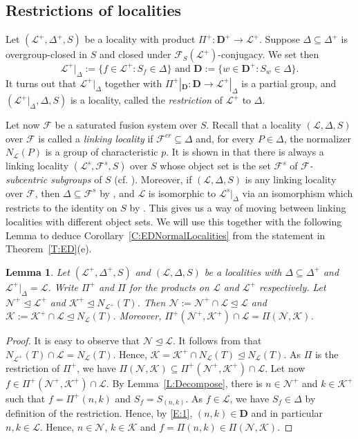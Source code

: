 \documentclass[reqno,11pt]{amsart}
\numberwithin{equation}{section}
\newtheorem{lemma}[theorem]{Lemma}
\theoremstyle{definition}
\newcommand{\F}{\mathcal{F}}
\renewcommand{\L}{\mathcal{L}}
\newcommand{\N}{\mathcal{N}}
\newcommand{\K}{\mathcal{K}}
\newcommand{\D}{\mathbf{D}}
\begin{document}
\subsection{Restrictions of localities}

Let $(\L^+,\Delta^+,S)$ be a locality with product $\Pi^+\colon\D^+\rightarrow\L^+$. Suppose $\Delta\subseteq\Delta^+$ is overgroup-closed in $S$ and closed under $\F_S(\L^+)$-conjugacy. We set then
\[\L^+|_\Delta:=\{f\in\L^+\colon S_f\in\Delta\}\mbox{ and }\D:=\{w\in\D^+\colon S_w\in\Delta\}.\]
It turns out that $\L^+|_\Delta$ together with $\Pi^+|_\D\colon \D\rightarrow\L^+|_\Delta$ is a partial group, and $(\L^+|_\Delta,\Delta,S)$ is a locality, called the \emph{restriction} of $\L^+$ to $\Delta$.

\smallskip

Let now $\F$ be a saturated fusion system over $S$. Recall that a locality $(\L,\Delta,S)$ over $\F$ is called a \emph{linking locality} if $\F^{cr}\subseteq\Delta$ and, for every $P\in\Delta$, the normalizer $N_\L(P)$ is a group of characteristic $p$. It is shown in \cite[Theorem~A(b)]{Henke:2015} that there is always a linking locality $(\L^s,\F^s,S)$ over $S$ whose object set is the set $\F^s$ of \emph{$\F$-subcentric subgroups} of $S$ (cf. \cite[Definition~1]{Henke:2015}). Moreover, if $(\L,\Delta,S)$ is any linking locality over $\F$, then $\Delta\subseteq\F^s$ by \cite[Proposition~1(b)]{Henke:2015}, and $\L$ is isomorphic to $\L^s|_\Delta$ via an isomorphism which restricts to the identity on $S$ by \cite[Theorem~A(a)]{Henke:2015}. This gives us a way of moving between linking localities with different object sets. We will use this together with the following Lemma to deduce Corollary~\ref{C:EDNormalLocalities} from the statement in Theorem~\ref{T:ED}(e).


\begin{lemma}\label{L:RestrictionLocality}
Let $(\L^+,\Delta^+,S)$ and $(\L,\Delta,S)$ be a localities with $\Delta\subseteq\Delta^+$ and $\L^+|_\Delta=\L$. Write $\Pi^+$ and $\Pi$ for the products on $\L$ and $\L^+$ respectively. Let $\N^+\unlhd\L^+$ and $\K^+\unlhd N_{\L^+}(T)$. Then $\N:=\N^+\cap\L\unlhd\L$ and $\K:=\K^+\cap\L\unlhd N_\L(T)$. Moreover, $\Pi^+(\N^+,\K^+)\cap\L=\Pi(\N,\K)$.
\end{lemma}

\begin{proof}
It is easy to observe that $\N\unlhd\L$. It follows from \cite[Lemma~2.23(b)]{Henke:2020} that $N_{\L^+}(T)\cap\L=N_\L(T)$. Hence, $\K=\K^+\cap N_\L(T)\unlhd N_\L(T)$. 
As $\Pi$ is the restriction of $\Pi^+$, we have $\Pi(\N,\K)\subseteq \Pi^+(\N^+,\K^+)\cap \L$. Let now $f\in\Pi^+(\N^+,\K^+)\cap \L$. By Lemma~\ref{L:Decompose}, there is $n\in\N^+$ and $k\in\K^+$ such that $f=\Pi^+(n,k)$ and $S_f=S_{(n,k)}$. As $f\in\L$, we have $S_f\in\Delta$ by definition of the restriction. Hence, by \eqref{E:1}, $(n,k)\in\D$ and in particular $n,k\in\L$. Hence, $n\in\N$, $k\in\K$ and $f=\Pi(n,k)\in\Pi(\N,\K)$. 
\end{proof}
\end{document}
